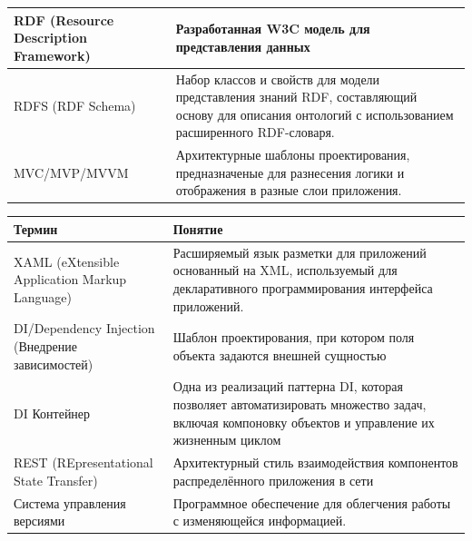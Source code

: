 \documentclass[12pt]{article}
\begin{document}
\begin{center}
\begin{tabular}{ | m{7cm} | m{7cm} | }
        \hline
        RDF (Resource Description Framework) & Разработанная W3C модель для представления данных                                                                                                                     \\
        \hline
        RDFS (RDF Schema)                    & Набор классов и свойств для модели представления знаний RDF, составляющий основу для описания онтологий с использованием расширенного RDF-словаря.                    \\
        \hline
        MVC/MVP/MVVM                         & Архитектурные шаблоны проектирования, предназначеные для разнесения логики и отображения в разные слои приложения.                                                    \\
        \hline
    \end{tabular}
\end{center}

\pagebreak

\begin{center}
    \begin{tabular}{ | m{7cm} | m{7cm} | }
        \hline
        \textbf{Термин}                                  & \textbf{Понятие}                                                                                                                                 \\
        \hline
        XAML (eXtensible Application Markup Language)    & Расширяемый язык разметки для приложений основанный на XML, используемый для декларативного программирования интерфейса приложений.              \\
        \hline
        DI/Dependency Injection (Внедрение зависимостей) & Шаблон проектирования, при котором поля объекта задаются внешней сущностью                                                                       \\
        \hline
        DI Контейнер                                     & Одна из реализаций паттерна DI, которая позволяет автоматизировать множество задач, включая компоновку объектов и управление их жизненным циклом \\
        \hline
        REST (REpresentational State Transfer)           & Архитектурный стиль взаимодействия компонентов распределённого приложения в сети                                                                 \\
        \hline
        Система управления версиями                      & Программное обеспечение для облегчения работы с изменяющейся информацией.                                                                        \\
        \hline
    \end{tabular}
\end{center}
\end{document}
